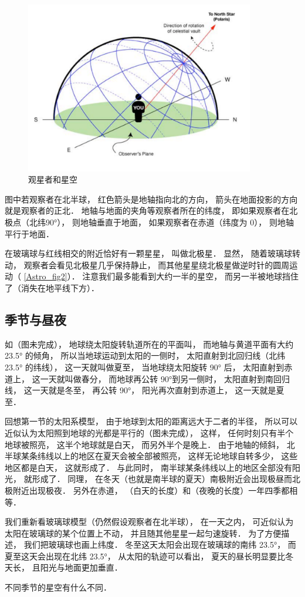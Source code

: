 \begin{figure}[ht]
\centering
\includegraphics[width=10cm]{./figures/Astro3.pdf}
\caption{观星者和星空} \label{Astro_fig3}
\end{figure}

图中若观察者在北半球， 红色箭头是地轴指向北的方向， 箭头在地面投影的方向就是观察者的正北． 地轴与地面的夹角等观察者所在的纬度， 即如果观察者在北极点（北纬90°）， 则地轴垂直于地面， 如果观察者在赤道（纬度为 0）， 则地轴平行于地面．

在玻璃球与红线相交的附近恰好有一颗星星， 叫做北极星． 显然， 随着玻璃球转动， 观察者会看见北极星几乎保持静止， 而其他星星绕北极星做逆时针的圆周运动（ \autoref{Astro_fig2}）． 注意我们最多能看到大约一半的星空， 而另一半被地球挡住了（消失在地平线下方）．

\subsection{季节与昼夜}

如（图未完成）， 地球绕太阳旋转轨道所在的平面叫， 而地轴与黄道平面有大约 23.5° 的倾角， 所以当地球运动到太阳的一侧时， 太阳直射到北回归线（北纬 23.5° 的纬线）， 这一天就叫做夏至， 当地球绕太阳旋转 90° 后， 太阳直射到赤道上， 这一天就叫做春分， 而地球再公转 90°到另一侧时， 太阳直射到南回归线， 这一天就是冬至， 再公转 90°， 阳光再次直射到赤道上， 这一天就是夏至．

回想第一节的太阳系模型， 由于地球到太阳的距离远大于二者的半径， 所以可以近似认为太阳照到地球的光都是平行的（图未完成）， 这样， 任何时刻只有半个地球被照亮， 这半个地球就是白天， 而另外半个是晚上． 由于地轴的倾斜， 北半球某条纬线以上的地区在夏天会被全部被照亮， 这样无论地球自转多少， 这些地区都是白天， 这就形成了． 与此同时， 南半球某条纬线以上的地区全部没有阳光， 就形成了． 同理， 在冬天（也就是南半球的夏天）南极附近会出现极昼而北极附近出现极夜． 另外在赤道， （白天的长度）和（夜晚的长度）一年四季都相等．


我们重新看玻璃球模型（仍然假设观察者在北半球）， 在一天之内， 可近似认为太阳在玻璃球的某个位置上不动， 并且随其他星星一起匀速旋转． 为了方便描述， 我们把玻璃球也画上纬度． 冬至这天太阳会出现在玻璃球的南纬 23.5°， 而夏至这天会出现在北纬 23.5°， 从太阳的轨迹可以看出， 夏天的昼长明显要比冬天长， 且阳光与地面更加垂直． 

不同季节的星空有什么不同．










